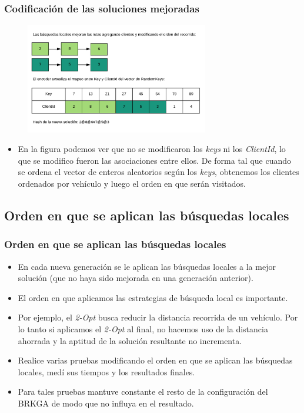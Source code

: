 \documentclass{beamer}
\begin{document}
\begin{frame}
\frametitle{Codificación de las soluciones mejoradas}

\begin{figure}[h]
	\centering
	\includegraphics[width=8cm]{codificacionDeSolucionParteDos}
	\label{fig:codificacionDeSolucionParteDos}
\end{figure}

\begin{itemize}
    \item En la figura podemos ver que no se modificaron los \textit{keys} ni los \textit{ClientId}, lo que se modifico fueron las asociaciones entre ellos. De forma tal que cuando se ordena el vector de enteros aleatorios según los \textit{keys}, obtenemos los clientes ordenados por vehículo y luego el orden en que serán visitados.
\end{itemize}

\end{frame}


\subsection{Orden en que se aplican las búsquedas locales}

\begin{frame}
\frametitle{Orden en que se aplican las búsquedas locales}

\begin{itemize}
    \item En cada nueva generación se le aplican las búsquedas locales a la mejor solución (que no haya sido mejorada en una generación anterior).
    \pause
    \item El orden en que aplicamos las estrategias de búsqueda local es importante.
    \pause
    \item Por ejemplo, el \textit{2-Opt} busca reducir la distancia recorrida de un vehículo. Por lo tanto si aplicamos el \textit{2-Opt} al final, no hacemos uso de la distancia ahorrada y la aptitud de la solución resultante no incrementa.
    \pause
    \item Realice varias pruebas modificando el orden en que se aplican las búsquedas locales, medí sus tiempos y los resultados finales.
    \pause
    \item Para tales pruebas mantuve constante el resto de la configuración del BRKGA de modo que no influya en el resultado.
\end{itemize}

\end{frame}
\end{document}
